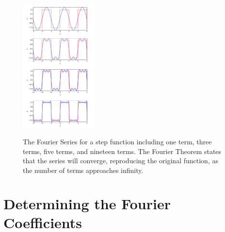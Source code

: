 \documentclass[12pt]{article}
\begin{document}
\begin{figure}[thb]
\begin{center}
{\includegraphics[width=0.35\textwidth]{figs/fsall.pdf}}
\end{center}
\caption{\label{fig:fall} The Fourier Series for a step function including one term, three terms, five terms, and nineteen terms.  The Fourier Theorem states that the series will converge, reproducing the original function, as the number of terms approaches infinity.}
\end{figure}

\section{Determining the Fourier Coefficients}
\label{sect:coeff}
\end{document}
